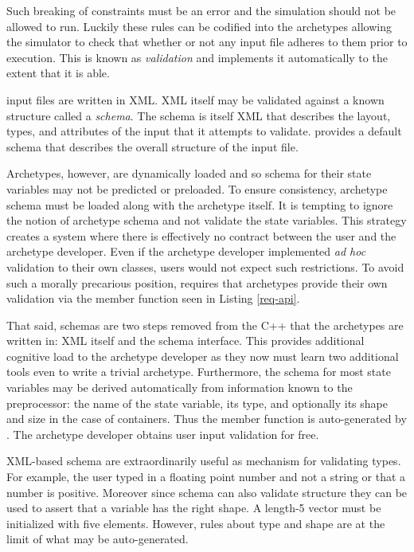 Such breaking of constraints must be an error and the simulation should not be 
allowed to run. Luckily these rules can be codified into the archetypes allowing 
the simulator to check that whether or not any input file adheres to them prior
to execution. This is known as \emph{validation} and \cyclus implements it 
automatically to the extent that it is able. 

\Cyclus input files are written in \gls{XML}. \gls{XML} itself may be validated against a 
known structure called a \emph{schema}. The schema is itself \gls{XML} that describes 
the layout, types, and attributes of the input that it attempts to validate.
\Cyclus provides a default schema that describes the overall structure of the 
input file.

Archetypes, however, are dynamically loaded and so schema for their state 
variables may not be predicted or preloaded. To ensure consistency, archetype schema 
must be loaded along with the archetype itself.  It is tempting to ignore the 
notion of archetype schema and not validate the state variables.
This strategy creates a system where there is effectively no contract between the 
user and the archetype developer. Even if the archetype developer implemented 
\emph{ad hoc} validation to their own classes, users would not expect such 
restrictions.  To avoid such a morally precarious position, \cyclus requires
that archetypes provide their own validation via the  member 
function seen in Listing \ref{req-api}.

That said, schemas are two steps removed from the C++ that the archetypes
are written in: \gls{XML} itself and the schema interface. This provides additional 
cognitive load to the archetype developer as they now must learn two additional
tools even to write a trivial archetype. Furthermore, the schema for most state
variables may be derived automatically from information known to the preprocessor:
the name of the state variable, its type, and optionally its shape and size in 
the case of containers. Thus the  member function is auto-generated
by \cycpp. The archetype developer obtains user input validation for free.

\gls{XML}-based schema are extraordinarily useful as mechanism for validating types. 
For example, the user typed in a floating point number and not a string or that 
a number is positive.
Moreover since schema can also validate structure they can be used to assert that 
a variable has the right shape. A length-5 vector must be initialized with 
five elements. However, rules about type and shape are at the limit of what may 
be auto-generated.

